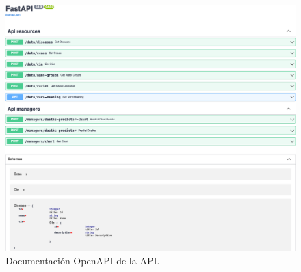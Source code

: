 \begin{figure}[]
	\centering	
	\includegraphics[scale=0.5]{doc/logos/imgs/openapi.png}
	\caption{ \cite{rtve-cis} Documentación OpenAPI de la API. }
    \label{fig:worst_f_value}
\end{figure}